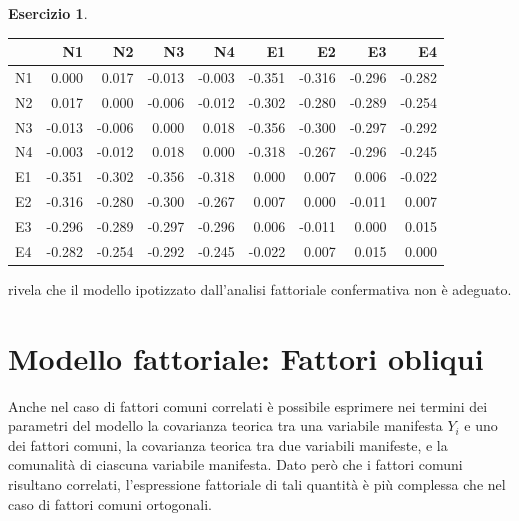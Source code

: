 \documentclass[
  11pt,
]{krantz}
\makeatletter
\newenvironment{Shaded}{\begin{snugshade}}{\end{snugshade}}
\newcommand{\AttributeTok}[1]{\textcolor[rgb]{0.61,0.61,0.61}{#1}}
\newcommand{\ConstantTok}[1]{\textcolor[rgb]{0,0,0}{#1}}
\newcommand{\DecValTok}[1]{\textcolor[rgb]{0.06,0.06,0.06}{#1}}
\newcommand{\FunctionTok}[1]{\textcolor[rgb]{0,0,0}{#1}}
\newcommand{\NormalTok}[1]{#1}
\newcommand{\OtherTok}[1]{\textcolor[rgb]{0.37,0.37,0.37}{#1}}
\newcommand{\SpecialCharTok}[1]{\textcolor[rgb]{0,0,0}{#1}}
\newcommand{\StringTok}[1]{\textcolor[rgb]{0.5,0.5,0.5}{#1}}
\newenvironment{kframe}{%
\medskip{}
\setlength{\fboxsep}{.8em}
 \def\at@end@of@kframe{}%
 \ifinner\ifhmode%
  \def\at@end@of@kframe{\end{minipage}}%
  \begin{minipage}{\columnwidth}%
 \fi\fi%
 \def\FrameCommand##1{\hskip\@totalleftmargin \hskip-\fboxsep
 \colorbox{shadecolor}{##1}\hskip-\fboxsep
     \hskip-\linewidth \hskip-\@totalleftmargin \hskip\columnwidth}%
 \MakeFramed {\advance\hsize-\width
   \@totalleftmargin\z@ \linewidth\hsize
   \@setminipage}}%
 {\par\unskip\endMakeFramed%
 \at@end@of@kframe}
\renewenvironment{Shaded}{\begin{kframe}}{\end{kframe}}
\theoremstyle{definition}
\theoremstyle{definition}
\theoremstyle{definition}
\newtheorem{exercise}{Esercizio}[chapter]
\theoremstyle{definition}
\theoremstyle{remark}
\makeatother
\begin{document}
\begin{exercise}
\begin{Shaded}
\end{Shaded}

\begin{longtable}[]{@{}lrrrrrrrr@{}}
\toprule
& N1 & N2 & N3 & N4 & E1 & E2 & E3 & E4 \\
\midrule
\endhead
N1 & 0.000 & 0.017 & -0.013 & -0.003 & -0.351 & -0.316 & -0.296 & -0.282 \\
N2 & 0.017 & 0.000 & -0.006 & -0.012 & -0.302 & -0.280 & -0.289 & -0.254 \\
N3 & -0.013 & -0.006 & 0.000 & 0.018 & -0.356 & -0.300 & -0.297 & -0.292 \\
N4 & -0.003 & -0.012 & 0.018 & 0.000 & -0.318 & -0.267 & -0.296 & -0.245 \\
E1 & -0.351 & -0.302 & -0.356 & -0.318 & 0.000 & 0.007 & 0.006 & -0.022 \\
E2 & -0.316 & -0.280 & -0.300 & -0.267 & 0.007 & 0.000 & -0.011 & 0.007 \\
E3 & -0.296 & -0.289 & -0.297 & -0.296 & 0.006 & -0.011 & 0.000 & 0.015 \\
E4 & -0.282 & -0.254 & -0.292 & -0.245 & -0.022 & 0.007 & 0.015 & 0.000 \\
\bottomrule
\end{longtable}

rivela che il modello ipotizzato dall'analisi fattoriale confermativa non è adeguato.
\end{exercise}

\hypertarget{modello-fattoriale-fattori-obliqui}{%
\section{Modello fattoriale: Fattori obliqui}\label{modello-fattoriale-fattori-obliqui}}

Anche nel caso di fattori comuni correlati è possibile esprimere nei termini dei parametri del modello la covarianza teorica tra una variabile manifesta \(Y_i\) e uno dei fattori comuni, la covarianza teorica tra due variabili manifeste, e la comunalità di ciascuna variabile manifesta. Dato però che i fattori comuni risultano correlati, l'espressione fattoriale di tali quantità è più complessa che nel caso di fattori comuni ortogonali.
\end{document}
